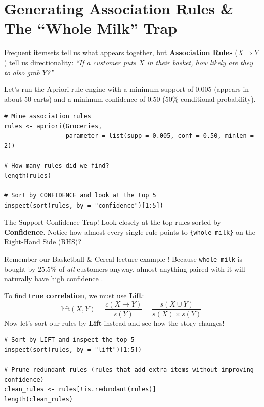 \documentclass[11pt]{article}
\begin{document}
\section{Generating Association Rules \& The ``Whole Milk'' Trap}

Frequent itemsets tell us what appears together, but \textbf{Association Rules} ($X \Rightarrow Y$) tell us directionality: \textit{``If a customer puts $X$ in their basket, how likely are they to also grab $Y$?''}

Let's run the Apriori rule engine with a minimum support of $0.005$ (appears in about 50 carts) and a minimum confidence of $0.50$ (50\% conditional probability).

\begin{lstlisting}[caption={Mining association rules and comparing Confidence vs. Lift.}]
# Mine association rules
rules <- apriori(Groceries, 
                 parameter = list(supp = 0.005, conf = 0.50, minlen = 2))

# How many rules did we find?
length(rules)

# Sort by CONFIDENCE and look at the top 5
inspect(sort(rules, by = "confidence")[1:5])
\end{lstlisting}

\begin{trapbox}{The Support-Confidence Trap!}
Look closely at the top rules sorted by \textbf{Confidence}. Notice how almost every single rule points to \texttt{\{whole milk\}} on the Right-Hand Side (RHS)? 

Remember our Basketball \& Cereal lecture example \cite{han2011data}! Because \texttt{whole milk} is bought by $25.5\%$ of \textit{all} customers anyway, almost anything paired with it will naturally have high confidence \cite{brin1997beyond}.

To find \textbf{true correlation}, we must use \textbf{Lift}:
\[
\text{lift}(X, Y) = \frac{c(X \rightarrow Y)}{s(Y)} = \frac{s(X \cup Y)}{s(X) \times s(Y)}
\]
Now let's sort our rules by \textbf{Lift} instead and see how the story changes!
\end{trapbox}

\begin{lstlisting}[caption={Sorting by Lift and removing redundant rules.}]
# Sort by LIFT and inspect the top 5
inspect(sort(rules, by = "lift")[1:5])

# Prune redundant rules (rules that add extra items without improving confidence)
clean_rules <- rules[!is.redundant(rules)]
length(clean_rules)
\end{lstlisting}
\end{document}
